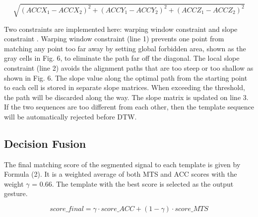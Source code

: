 \begin{tiny}
\begin{equation}
\sqrt{(ACCX_1 - ACCX_2)^2 + (ACCY_1 - ACCY_2)^2 + (ACCZ_1 - ACCZ_2)^2}
\end{equation}
\end{tiny}

Two constraints are implemented here: warping window
constraint and slope constraint \cite{c11}. Warping window constraint
(line 1) prevents one point from matching any point
too far away by setting global forbidden area, shown as the
gray cells in Fig. 6, to eliminate the path far off the diagonal.
The local slope constraint (line 2) avoids the alignment paths
that are too steep or too shallow as shown in Fig. 6. The
slope value along the optimal path from the starting point to
each cell is stored in separate slope matrices. When exceeding
the threshold, the path will be discarded along the way. The
slope matrix is updated on line 3. If the two sequences are too
different from each other, then the template sequence will be
automatically rejected before DTW.
\subsection{Decision Fusion}
The final matching score of the segmented signal to each
template is given by Formula (2). It is a weighted average
of both MTS and ACC scores with the weight $\gamma$ = 0.66. The
template with the best score is selected as the output gesture.

\begin{small}
\begin{equation}
score\_final = \gamma\cdot score\_ACC+(1-\gamma)\cdot score\_MTS
\end{equation}
\end{small}